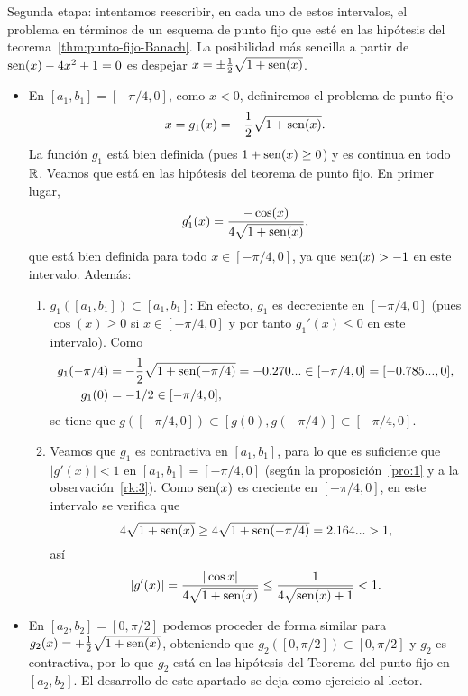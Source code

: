 \begin{example}
  \textsf{Segunda etapa}: intentamos reescribir, en cada uno de
  estos intervalos, el problema en términos de un esquema de punto
  fijo que esté en las hipótesis del teorema~\ref{thm:punto-fijo-Banach}. La
  posibilidad más sencilla a partir de $\operatorname{sen}(x)-4x^2+1=0$ es despejar
  $x=\pm \frac 12 \sqrt{1+\operatorname{sen}(x)}$.
  \begin{itemize}
  \item En $[a_1,b_1]=[-\pi/4, 0]$, como $x<0$, definiremos el
    problema de punto fijo
    $$
    x=g_1(x)=-\dfrac 12 \sqrt{1+\operatorname{sen}(x)}.
    $$
    La función $g_1$ está bien definida (pues $1+\operatorname{sen}(x)\ge 0$) y es
    continua en todo $\operatorname{{\mathbb R}}$. Veamos que está en las hipótesis del
    teorema de punto fijo. En primer lugar,
    $$
    g_1'(x)=\frac{-\cos(x)}{4\sqrt{1+\operatorname{sen}(x)}},
    $$
    que está bien definida para todo $x\in[-\pi/4, 0]$, ya que
    $\operatorname{sen}(x)>-1$ en este intervalo. Además:
    \begin{enumerate}
    \item $g_1([a_1,b_1])\subset [a_1,b_1]$: En efecto, $g_1$ es
      decreciente en $[-\pi/4,0]$ (pues $\cos(x)\ge 0$ si $x\in
      [-\pi/4, 0]$ y por tanto $g_1'(x)\le 0$ en este intervalo).
      Como
      \begin{align*}
        g_1(-\pi/4)&= -\frac12 \sqrt{1+\operatorname{sen}(-\pi/4)}=-0.270...\in
                     [-\pi/4,0]=[-0.785...,0],
        \\
        g_1(0)&=-1/2 \in [-\pi/4,0],
      \end{align*}
      se tiene que $g([-\pi/4,0])\subset
      [g(0),g(-\pi/4)] \subset [-\pi/4,0]$.
    \item Veamos que $g_1$ es contractiva en $[a_1,b_1]$, para lo que es
      suficiente que $|g'(x)|<1$ en $[a_1,b_1]=[-\pi/4,0]$ (según la
      proposición~\ref{pro:1} y a la observación~\ref{rk:3}).  Como
      $\operatorname{sen}(x)$ es creciente en $[-\pi/4,0]$, en este intervalo se
      verifica que
      $$4\sqrt{1+\operatorname{sen}(x)}\ge 4\sqrt{1+\operatorname{sen}(-\pi/4)}=2.164... >1,$$
      así
      $$
      \left|g'(x)\right| = \frac{|\cos{x}|}{4\sqrt{1+\operatorname{sen}(x)}} \le
      \frac{1}{4\sqrt{\operatorname{sen}(x)+1}} < 1.
      $$
    \end{enumerate}
  \item En $[a_2,b_2]=[0,\pi/2]$ podemos proceder de forma similar para
    $g_2(x)=+\frac 12 \sqrt{1+\operatorname{sen}(x)}$, obteniendo que
    $g_2([0,\pi/2])\subset[0,\pi/2]$ y $g_2$ es contractiva, por lo que
    $g_2$ está en las hipótesis del Teorema del punto fijo en
    $[a_2,b_2]$. El desarrollo de este apartado se deja como ejercicio
    al lector.

\end{itemize}
\end{example}
